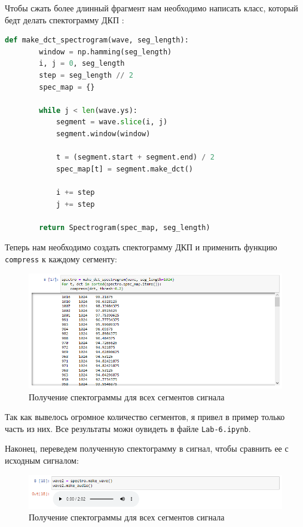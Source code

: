 \documentclass[a4paper]{article}
\begin{document}
            Чтобы сжать более длинный фрагмент нам необходимо написать класс, который бедт делать спектограмму ДКП :
            
\begin{lstlisting}[language=Python, caption= Класс \texttt{make-dct-spectrogram}]
    def make_dct_spectrogram(wave, seg_length):
        window = np.hamming(seg_length)
        i, j = 0, seg_length
        step = seg_length // 2
        spec_map = {}
    
        while j < len(wave.ys):
            segment = wave.slice(i, j)
            segment.window(window)
    
            t = (segment.start + segment.end) / 2
            spec_map[t] = segment.make_dct()
    
            i += step
            j += step
    
        return Spectrogram(spec_map, seg_length)
\end{lstlisting} 
            
            Теперь нам необходимо создать спектограмму ДКП и применить функцию \texttt{compress} к каждому сегменту:
            
            \begin{figure}[H]
                \centering
                \includegraphics[width=\textwidth]{ex_2_spectogramma.png}
                \caption{Получение спектограммы для всех сегментов сигнала}
                \label{fig:ex_2_spectogramma}
            \end{figure}
            
            Так как вывелось огромное количество сегментов, я привел в пример только часть из них. Все результаты можн оувидеть в файле \texttt{Lab-6.ipynb}. 
            
            Наконец, переведем полученную спектограмму в сигнал, чтобы сравнить ее с исходным сигналом:
            
            \begin{figure}[H]
                \centering
                \includegraphics[width=\textwidth]{ex_2_result_audio.png}
                \caption{Получение спектограммы для всех сегментов сигнала}
                \label{fig:ex_2_result_audio}
            \end{figure}
            
\end{document}
